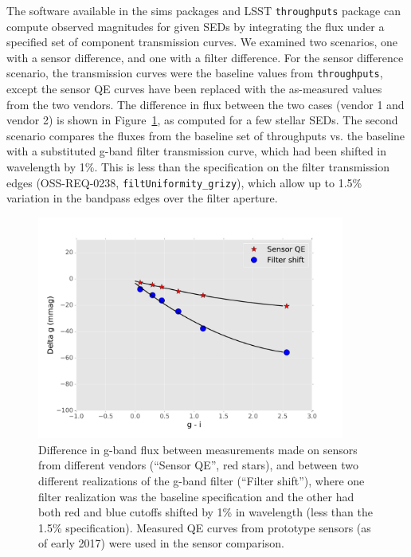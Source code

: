 \documentclass[12pt]{article}
\newcommand{\code}[1]{\texttt{#1}}
\begin{document}
The software available in the sims packages and LSST \code{throughputs} package
can compute observed magnitudes for given SEDs by integrating the flux under a
specified set of component transmission curves. We examined two scenarios, one
with a sensor difference, and one with a filter difference. For the sensor
difference scenario, the transmission curves were the baseline values from
\code{throughputs}, except the sensor QE curves have been replaced with the
as-measured values from the two vendors. The difference in flux between the two
cases (vendor 1 and vendor 2) is shown in Figure~\ref{fig:delta_g_vs_color}, as
computed for a few stellar SEDs. The second scenario compares the fluxes from
the baseline set of throughputs vs. the baseline with a substituted g-band
filter transmission curve, which had been shifted in wavelength by 1\%. This is
less than the specification on the filter transmission edges (OSS-REQ-0238,
\code{filtUniformity\_grizy}), which allow up to 1.5\% variation in the bandpass
edges over the filter aperture.

\begin{figure}
\includegraphics[width=0.9\textwidth]{figures/delta_g_vs_color.pdf}
\caption{Difference in g-band flux between measurements made on sensors from
different vendors (``Sensor QE'', red stars), and between two different
realizations of the g-band filter (``Filter shift''), where one filter
realization was the baseline specification and the other had both red and blue
cutoffs shifted by 1\% in wavelength (less than the 1.5\% specification).
Measured QE curves from prototype sensors (as of early 2017) were used in the
sensor comparison.
\label{fig:delta_g_vs_color}}
\end{figure}
\end{document}
